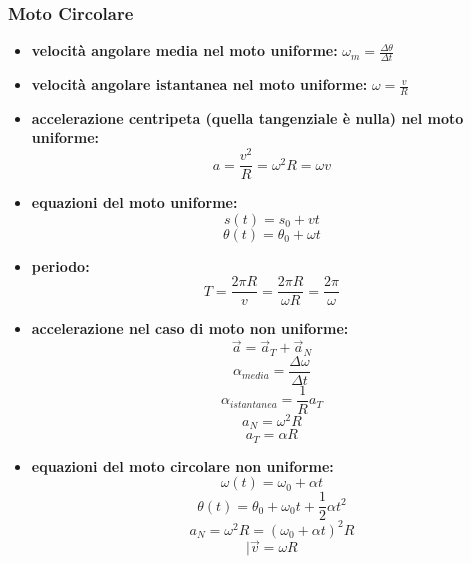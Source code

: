 \documentclass[a4paper,12pt, oneside]{book}
\begin{document}
\subsubsection{Moto Circolare}
\begin{itemize}
\item \textbf{velocità angolare media nel moto uniforme:} $\omega_m=\frac{\Delta\theta}{\Delta t}$
\item \textbf{velocità angolare istantanea nel moto uniforme:} $\omega=\frac{v}{R}$
\item \textbf{accelerazione centripeta (quella tangenziale è nulla) nel moto uniforme:} 
$$a=\frac{v^2}{R}=\omega^2R=\omega v$$
\item \textbf{equazioni del moto uniforme:}
$$s(t)=s_0+vt$$
$$\theta(t)=\theta_0+\omega t$$
\item \textbf{periodo:}
$$T=\frac{2\pi R}{v}=\frac{2\pi R}{\omega R}=\frac{2\pi}{\omega}$$
\item \textbf{accelerazione nel caso di moto non uniforme:}
$$\vec{a}=\vec{a}_T+\vec{a}_N$$
$$\alpha_{media}=\frac{\Delta\omega}{\Delta t}$$
$$\alpha_{istantanea}=\frac{1}{R}a_T$$
$$a_N=\omega^2 R$$
$$a_T=\alpha R$$
\item \textbf{equazioni del moto circolare non uniforme:}
$$\omega(t)=\omega_0+\alpha t$$
$$\theta(t)=\theta_0+\omega_0t+\frac{1}{2}\alpha t^2$$
$$a_N=\omega^2 R=(\omega_0+\alpha t)^2 R$$
$$|\vec{v}=\omega R$$
\end{itemize}
\end{document}
